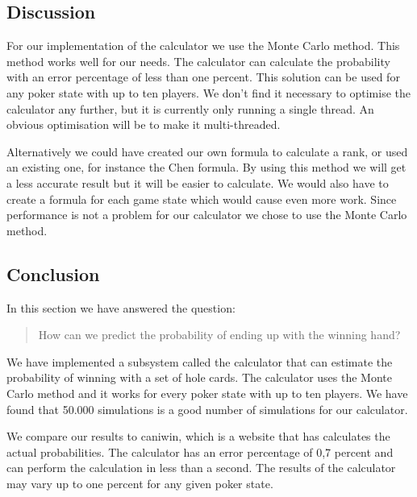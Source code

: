 \subsection{Discussion}
For our implementation of the calculator we use the Monte Carlo method. This method works well for our needs. The calculator can calculate the probability with an error percentage of less than one percent. This solution can be used for any poker state with up to ten players. We don't find it necessary to optimise the calculator any further, but it is currently only running a single thread. An obvious optimisation will be to make it multi-threaded.

Alternatively we could have created our own formula to calculate a rank, or used an existing one, for instance the Chen formula. By using this method we will get a less accurate result but it will be easier to calculate. We would also have to create a formula for each game state which would cause even more work. Since performance is not a problem for our calculator we chose to use the Monte Carlo method.

\subsection{Conclusion}
In this section we have answered the question:
\begin{quotation}
How can we predict the probability of ending up with the winning hand?
\end{quotation}

We have implemented a subsystem called the calculator that can estimate the probability of winning with a set of hole cards. The calculator uses the Monte Carlo method and it works for every poker state with up to ten players. We have found that 50.000 simulations is a good number of simulations for our calculator. 

We compare our results to caniwin, which is a website that has calculates the actual probabilities. The calculator has an error percentage of 0,7 percent and can perform the calculation in less than a second. The results of the calculator may vary up to one percent for any given poker state.
